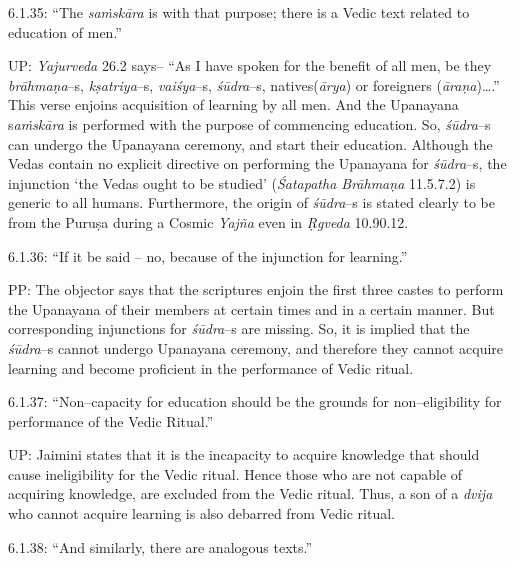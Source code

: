 6.1.35: “The \textit{saṁskāra} is with that purpose; there is a Vedic text related to education of men.”

UP: \textit{Yajurveda} 26.2 says– “As I have spoken for the benefit of all men, be they \textit{brāhmaṇa}–s, \textit{kṣatriya}–s, \textit{vaiśya}–s, \textit{śūdra}–s, natives(\textit{ārya}) or foreigners (\textit{āraṇa})….” This verse enjoins acquisition of learning by all men. And the Upanayana s\textit{aṁskāra} is performed with the purpose of commencing education. So, \textit{śūdra}–s can undergo the Upanayana ceremony, and start their education. Although the Vedas contain no explicit directive on performing the Upanayana for \textit{śūdra}–s, the injunction ‘the Vedas ought to be studied’ (\textit{Śatapatha Brāhmaṇa} 11.5.7.2) is generic to all humans. Furthermore, the origin of \textit{śūdra}–s is stated clearly to be from the Puruṣa during a Cosmic \textit{Yajña} even in \textit{Ṛgveda} 10.90.12.

6.1.36: “If it be said – no, because of the injunction for learning.”

PP: The objector says that the scriptures enjoin the first three castes to perform the Upanayana of their members at certain times and in a certain manner. But corresponding injunctions for \textit{śūdra}–s are missing. So, it is implied that the \textit{śūdra}–s cannot undergo Upanayana ceremony, and therefore they cannot acquire learning and become proficient in the performance of Vedic ritual.

6.1.37: “Non–capacity for education should be the grounds for non–eligibility for performance of the Vedic Ritual.”

UP: Jaimini states that it is the incapacity to acquire knowledge that should cause ineligibility for the Vedic ritual. Hence those who are not capable of acquiring knowledge, are excluded from the Vedic ritual. Thus, a son of a \textit{dvija }who cannot acquire learning is also debarred from Vedic ritual.

6.1.38: “And similarly, there are analogous texts.”

